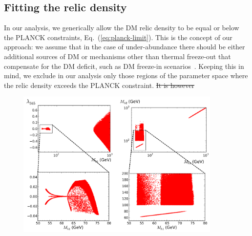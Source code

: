 \documentclass[12pt,a4paper]{article}
\providecommand{\DIFaddtex}[1]{{\protect\color{blue}\uwave{#1}}} %
\providecommand{\DIFdeltex}[1]{{\protect\color{red}\sout{#1}}}                      %
\providecommand{\DIFaddbegin}{} %
\providecommand{\DIFdelbegin}{} %
\providecommand{\DIFdelend}{} %
\providecommand{\DIFaddFL}[1]{\DIFadd{#1}} %
\providecommand{\DIFadd}[1]{\texorpdfstring{\DIFaddtex{#1}}{#1}} %
\providecommand{\DIFdel}[1]{\texorpdfstring{\DIFdeltex{#1}}{}} %
\begin{document}
\subsection{Fitting the relic density}

In our analysis, we generically allow the DM relic density to be equal or
below the PLANCK constraints, Eq.~(\ref{eq:planck-limit}).
This is the concept of our approach: we assume that in the case of under-abundance
there should be either additional sources of DM or mechanisms other than thermal freeze-out that 
compensate for the DM deficit, such as DM freeze-in scenarios~\cite{Hall:2009bx}.
Keeping this in mind, we exclude in our analysis only those regions of the parameter space 
where the relic density exceeds the PLANCK constraint.
\DIFdelbegin \DIFdel{It is however }\DIFdelend \DIFaddbegin 

\begin{figure}[htb]
\begin{center}
\includegraphics[width=0.9\textwidth]{simplified-fitting.png}
\caption{\DIFaddFL{Regions... }\label{fig:scan-simplified-fitting}} 
\end{center}
\end{figure}
\end{document}
